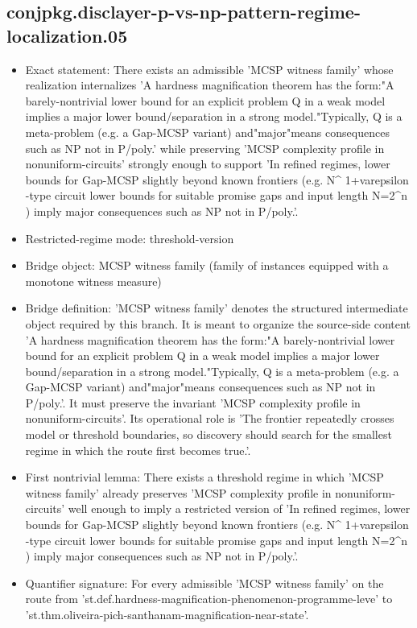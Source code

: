 \documentclass[11pt]{article}
\begin{document}
\subsection*{conjpkg.disclayer-p-vs-np-pattern-regime-localization.05}
\begin{itemize}
\item Exact statement: There exists an admissible 'MCSP witness family' whose realization internalizes 'A hardness magnification theorem has the form:"A barely-nontrivial lower bound for an explicit problem Q in a weak model implies a major lower bound/separation in a strong model."Typically, Q is a meta-problem (e.g. a Gap-MCSP variant) and"major"means consequences such as NP not in P/poly.' while preserving 'MCSP complexity profile in nonuniform-circuits' strongly enough to support 'In refined regimes, lower bounds for Gap-MCSP slightly beyond known frontiers (e.g. N\textasciicircum{} 1+varepsilon -type circuit lower bounds for suitable promise gaps and input length N=2\textasciicircum{}n ) imply major consequences such as NP not in P/poly.'.
\item Restricted-regime mode: threshold-version
\item Bridge object: MCSP witness family (family of instances equipped with a monotone witness measure)
\item Bridge definition: 'MCSP witness family' denotes the structured intermediate object required by this branch. It is meant to organize the source-side content 'A hardness magnification theorem has the form:"A barely-nontrivial lower bound for an explicit problem Q in a weak model implies a major lower bound/separation in a strong model."Typically, Q is a meta-problem (e.g. a Gap-MCSP variant) and"major"means consequences such as NP not in P/poly.'. It must preserve the invariant 'MCSP complexity profile in nonuniform-circuits'. Its operational role is 'The frontier repeatedly crosses model or threshold boundaries, so discovery should search for the smallest regime in which the route first becomes true.'.
\item First nontrivial lemma: There exists a threshold regime in which 'MCSP witness family' already preserves 'MCSP complexity profile in nonuniform-circuits' well enough to imply a restricted version of 'In refined regimes, lower bounds for Gap-MCSP slightly beyond known frontiers (e.g. N\textasciicircum{} 1+varepsilon -type circuit lower bounds for suitable promise gaps and input length N=2\textasciicircum{}n ) imply major consequences such as NP not in P/poly.'.
\item Quantifier signature: For every admissible 'MCSP witness family' on the route from 'st.def.hardness-magnification-phenomenon-programme-leve' to 'st.thm.oliveira-pich-santhanam-magnification-near-state'.

\end{itemize}
\end{document}
